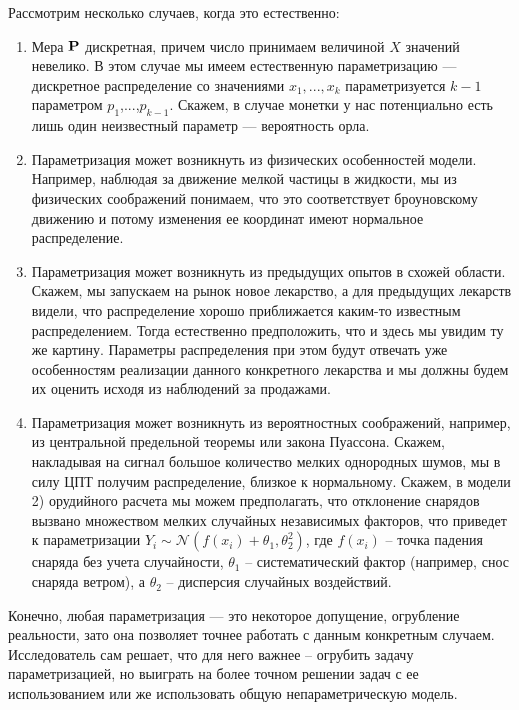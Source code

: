 \documentclass[10 pt,russian]{article}
\begin{document}
Рассмотрим несколько случаев, когда это естественно:
\begin{enumerate}
\item Мера ${\bf P}$ дискретная, причем число принимаем величиной $X$ значений невелико. В этом случае мы имеем естественную параметризацию --- дискретное распределение со значениями $x_1,...,x_k$ параметризуется $k-1$ параметром $p_1$,...,$p_{k-1}$. Скажем, в случае монетки у нас потенциально есть лишь один неизвестный параметр --- вероятность орла.
\item Параметризация может возникнуть из физических особенностей модели. Например, наблюдая за движение мелкой частицы в жидкости, мы из физических соображений понимаем, что это соответствует броуновскому движению и потому изменения ее координат имеют нормальное распределение.
\item Параметризация может возникнуть из предыдущих опытов в схожей области. Скажем, мы запускаем на рынок новое лекарство, а для предыдущих лекарств видели, что распределение хорошо приближается каким-то известным распределением. Тогда естественно предположить, что и здесь мы увидим ту же картину. Параметры распределения при этом будут отвечать уже особенностям реализации данного конкретного лекарства и мы должны будем их оценить исходя из наблюдений за продажами.
\item Параметризация может возникнуть из вероятностных соображений, например, из центральной предельной теоремы или закона Пуассона. Скажем, накладывая на сигнал большое количество мелких однородных шумов, мы в силу ЦПТ получим распределение, близкое к нормальному. Скажем, в модели 2) орудийного расчета мы можем предполагать, что отклонение снарядов вызвано множеством мелких случайных независимых факторов, что приведет к параметризации $Y_i\sim \mathcal{N}(f(x_i)+\theta_1,\theta_2^2)$, где $f(x_i)$ -- точка падения снаряда без учета случайности, $\theta_1$ -- систематический фактор (например, снос снаряда ветром), а $\theta_2$ -- дисперсия случайных воздействий.
\end{enumerate}
Конечно, любая параметризация --- это некоторое допущение, огрубление реальности, зато она позволяет точнее работать с данным конкретным случаем. Исследователь сам решает, что для него важнее -- огрубить задачу параметризацией, но выиграть на более точном решении задач с ее использованием или же использовать общую непараметрическую модель.
\end{document}
